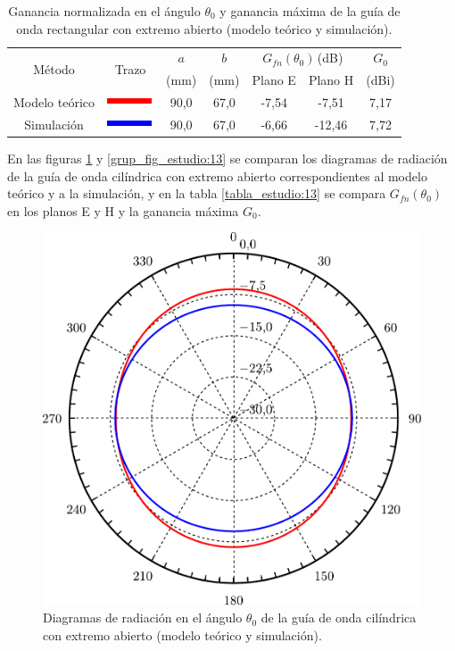 \begin{table}[H]
\centering
\begin{tabular}{|c|c|c|c|c|c|c|}
\hline
\multirow{2}{*}{Método} & \multirow{2}{*}{Trazo} & $a$ & $b$ & \multicolumn{2}{c|}{$G_{fn}\left(\theta_0\right)\,$(dB)} & $G_0$ \\
\cline{5-6}
& & (mm) & (mm) & Plano E & Plano H & (dBi)\\
\hline
Modelo teórico & \includegraphics[scale = 1]{Figures/Estudio/linea_tabla_rojo} & 90,0 & 67,0 & -7,54 & -7,51 & 7,17 \\
\hline
Simulación & \includegraphics[scale = 1]{Figures/Estudio/linea_tabla_azul} & 90,0 & 67,0 & -6,66 & -12,46 & 7,72 \\
\hline
\end{tabular}
\caption{Ganancia normalizada en el ángulo $\theta_0$ y ganancia máxima de la guía de onda rectangular con extremo abierto (modelo teórico y simulación).}
\label{tabla_estudio:12}
\end{table}
En las figuras \ref{fig_estudio:48} y \ref{grup_fig_estudio:13} se comparan los diagramas de radiación de la guía de onda cilíndrica con extremo abierto correspondientes al modelo teórico y a la simulación, y en la tabla \ref{tabla_estudio:13} se compara $G_{fn}\left(\theta_0\right)$ en los planos E y H y la ganancia máxima $G_0$.
\begin{figure}[H]
\centering
\includegraphics[scale = 0.5]{Figures/Estudio/estudio_48}
\caption{Diagramas de radiación en el ángulo $\theta_0$ de la guía de onda cilíndrica con extremo abierto (modelo teórico y simulación).}
\label{fig_estudio:48}
\end{figure}
